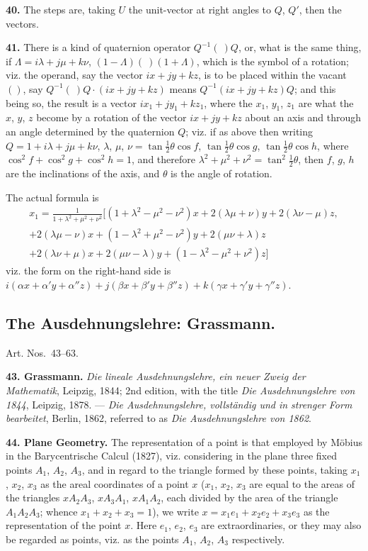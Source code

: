 \documentclass[11pt,a4paper]{article}
\theoremstyle{definition}
\begin{document}
\textbf{40.} The steps are, taking $U$ the unit-vector at right angles to $Q$, $Q'$, then the vectors.

\textbf{41.} There is a kind of quaternion operator $Q^{-1}(\ )Q$, or, what is the same thing, if $\Lambda = i\lambda + j\mu + k\nu$, $(1 - \Lambda)(\ )(1 + \Lambda)$, which is the symbol of a rotation; viz. the operand, say the vector $ix + jy + kz$, is to be placed within the vacant $( )$, say $Q^{-1}(\ )Q \cdot (ix + jy + kz)$ means $Q^{-1}(ix + jy + kz)Q$; and this being so, the result is a vector $ix_1 + jy_1 + kz_1$, where the $x_1$, $y_1$, $z_1$ are what the $x$, $y$, $z$ become by a rotation of the vector $ix + jy + kz$ about an axis and through an angle determined by the quaternion $Q$; viz. if as above then writing $Q = 1 + i\lambda + j\mu + k\nu$, $\lambda$, $\mu$, $\nu = \tan\tfrac{1}{2}\theta \cos f$, $\tan\tfrac{1}{2}\theta \cos g$, $\tan\tfrac{1}{2}\theta \cos h$, where $\cos^2 f + \cos^2 g + \cos^2 h = 1$, and therefore $\lambda^2 + \mu^2 + \nu^2 = \tan^2\tfrac{1}{2}\theta$, then $f$, $g$, $h$ are the inclinations of the axis, and $\theta$ is the angle of rotation.

The actual formula is
\begin{multline*}
x_1 = \frac{1}{1 + \lambda^2 + \mu^2 + \nu^2} [(1 + \lambda^2 - \mu^2 - \nu^2)x + 2(\lambda\mu + \nu)y + 2(\lambda\nu - \mu)z, \\
+ 2(\lambda\mu - \nu)x + (1 - \lambda^2 + \mu^2 - \nu^2)y + 2(\mu\nu + \lambda)z \\
+ 2(\lambda\nu + \mu)x + 2(\mu\nu - \lambda)y + (1 - \lambda^2 - \mu^2 + \nu^2)z]
\end{multline*}
viz. the form on the right-hand side is $i(\alpha x + \alpha' y + \alpha'' z) + j(\beta x + \beta' y + \beta'' z) + k(\gamma x + \gamma' y + \gamma'' z)$.

\subsection*{The Ausdehnungslehre: Grassmann.}

Art. Nos.~43--63.

\textbf{43. Grassmann.} \textit{Die lineale Ausdehnungslehre, ein neuer Zweig der Mathematik}, Leipzig, 1844; 2nd edition, with the title \textit{Die Ausdehnungslehre von 1844}, Leipzig, 1878. --- \textit{Die Ausdehnungslehre, vollst\"andig und in strenger Form bearbeitet}, Berlin, 1862, referred to as \textit{Die Ausdehnungslehre von 1862}.

\textbf{44. Plane Geometry.} The representation of a point is that employed by M\"obius in the Barycentrische Calcul (1827), viz. considering in the plane three fixed points $A_1$, $A_2$, $A_3$, and in regard to the triangle formed by these points, taking $x_1$, $x_2$, $x_3$ as the areal coordinates of a point $x$ ($x_1$, $x_2$, $x_3$ are equal to the areas of the triangles $xA_2A_3$, $xA_3A_1$, $xA_1A_2$, each divided by the area of the triangle $A_1A_2A_3$; whence $x_1 + x_2 + x_3 = 1$), we write $x = x_1e_1 + x_2e_2 + x_3e_3$ as the representation of the point $x$. Here $e_1$, $e_2$, $e_3$ are extraordinaries, or they may also be regarded as points, viz. as the points $A_1$, $A_2$, $A_3$ respectively.
\end{document}
